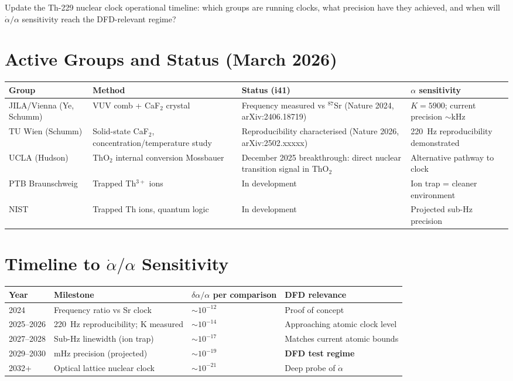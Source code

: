 \documentclass[11pt,a4paper]{article}
\begin{document}
Update the Th-229 nuclear clock operational timeline: which groups are running clocks, what precision have they achieved, and when will $\dot{\alpha}/\alpha$ sensitivity reach the DFD-relevant regime?

\section{Active Groups and Status (March 2026)}

\begin{center}
\begin{longtable}{p{3cm}p{3cm}p{3cm}p{3cm}}
\toprule
\textbf{Group} & \textbf{Method} & \textbf{Status (i41)} & \textbf{$\alpha$ sensitivity} \\
\midrule
\endhead
JILA/Vienna (Ye, Schumm) & VUV comb + CaF$_2$ crystal & Frequency measured vs $^{87}$Sr (Nature 2024, arXiv:2406.18719) & $K = 5900$; current precision $\sim$kHz \\
\midrule
TU Wien (Schumm) & Solid-state CaF$_2$, concentration/temperature study & Reproducibility characterised (Nature 2026, arXiv:2502.xxxxx) & 220~Hz reproducibility demonstrated \\
\midrule
UCLA (Hudson) & ThO$_2$ internal conversion Mossbauer & December 2025 breakthrough: direct nuclear transition signal in ThO$_2$ & Alternative pathway to clock \\
\midrule
PTB Braunschweig & Trapped Th$^{3+}$ ions & In development & Ion trap = cleaner environment \\
\midrule
NIST & Trapped Th ions, quantum logic & In development & Projected sub-Hz precision \\
\bottomrule
\end{longtable}
\end{center}

\section{Timeline to $\dot{\alpha}/\alpha$ Sensitivity}

\begin{center}
\begin{tabular}{llll}
\toprule
\textbf{Year} & \textbf{Milestone} & \textbf{$\delta\alpha/\alpha$ per comparison} & \textbf{DFD relevance} \\
\midrule
2024 & Frequency ratio vs Sr clock & $\sim 10^{-12}$ & Proof of concept \\
2025--2026 & 220~Hz reproducibility; K measured & $\sim 10^{-14}$ & Approaching atomic clock level \\
2027--2028 & Sub-Hz linewidth (ion trap) & $\sim 10^{-17}$ & Matches current atomic bounds \\
2029--2030 & mHz precision (projected) & $\sim 10^{-19}$ & \textbf{DFD test regime} \\
2032+ & Optical lattice nuclear clock & $\sim 10^{-21}$ & Deep probe of $\dot{\alpha}$ \\
\bottomrule
\end{tabular}
\end{center}
\end{document}
